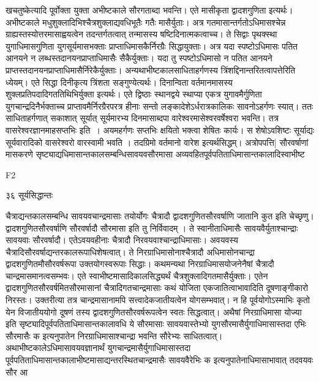 \documentclass[11pt, openany]{book}
\begin{document}
\begin{sloppypar}
\noindent खचतुष्केत्यादि पूर्वोक्ता युक्ता अभीष्टकाले सौरगताब्दा भवन्ति। एते मासीकृता द्वादशगुणिता इत्यर्थः। अभीष्टकाले मधुशुक्लादिभिश्चैत्रशुक्लाद्यवधिभूतैः गतैः मासैर्युताः। अत्र गतमासान्तर्गतोऽधिमासश्चेन्न ग्राह्यस्तस्योत्तरमासाह्वयत्वेन तदन्तर्गतत्वात् तन्मासस्य षष्टिदिनात्मकत्वाच्च। ते सिद्वाः पृथक्स्था युगाधिमासगुणिता युगसूर्यमासभक्ताः प्राप्ताधिमासकैर्निरग्रैः सिद्धायुक्ताः। अत्र यदा स्पष्टोऽधिमासः पतित आनयने न लब्धस्तदानयनप्राप्ताधिमासैः सैकैर्युक्ताः। यदा तु स्पष्टोऽधिमासो न पतित आनयने प्राप्तस्तदानयनप्राप्ताधिमासैर्निरेकैर्युक्ताः। अन्यथाभीष्टकालसाधिताहर्गणस्य त्रिंशद्दिनान्तरितत्वापत्तेरिति ध्येयम्। एते सिद्धा दिनीकृत्य त्रिंशता सङ्गुण्येत्यर्थः। दिनान्विता वर्तमानमासस्य शुक्लप्रतिपदादिगततिथिभिर्युक्ता इत्यर्थः। एते द्विष्ठाः स्थानद्वये स्थाप्या एकत्र युगावमैर्गुणिता युगचान्द्रदिनैर्भक्ताच्च प्राप्तावमैर्निरग्रैरपरत्र हीनाः सन्तो लङ्कादेशेऽर्धरात्रकालिकः सावनोऽहर्गणः स्यात्। ततः साधिताहर्गणात् सकाशात् सूर्यात् सूर्यमारभ्य दिनमासाब्दपा वारेश्वरमासेश्वरवर्षेश्वरा भवन्ति। तत्र वासरेश्वरज्ञानमाह\textendash सप्तभिः इति~। अयमहर्गणः सप्तभिः क्षयितो भक्त्वा शेषितः कार्यः। स शेषोऽवशिष्टः सूर्याद्यः सूर्यवारादिको वासरेश्वरो वारस्वामी भवति । तदग्रिमो वर्तमानो वारेश इत्यर्थसिद्धम्।  अत्रोपपत्ति| सौरवर्षाणां मासकरणे सृष्ट्याद्यधिमासान्तकालसम्बन्धिसावयवसौरमासा अव्यवहितपूर्वपतिताधिमासान्तकालादिस्वाभीष्ट\textendash
\end{sloppypar}
{\tiny{F2}}

\newpage

\noindent ३६ \hspace{4cm} सूर्यसिद्धान्तः
\vspace{1cm}

\begin{sloppypar}
\noindent चैत्राद्यन्तकालसम्बन्धि सावयवचान्द्रमासाः तयोर्योगः चैत्रादौ द्वादशगुणितसौरवर्षाणि जातानि कुत इति चेच्छृणु। द्वादशगुणितसौरवर्षाणि सौरवर्षादौ सौरमासा इति तु निर्विवादम् । ते स्वानीताधिमासैः सावयवैर्युताश्चान्द्राः सावयवाः सौरवर्षादौ। एतेऽवयवहीनाः चैत्रादौ निरवयवाश्चान्द्राधिमासाः। अवयवस्य चैत्रादिसौरवर्षाद्यन्तरकालरूपाधिशेषत्वात्। ते निरग्राधिमासोनाश्चैत्रादौ अधिमासोनचान्द्रा द्वादशगुणितमौसौरवर्षरूपा उक्तयोगस्वरूपाः सिद्धाः। कथमन्यथा निरग्राधिमासयोजनेनैषां चैत्रादौ चान्द्रमासमानत्वसम्भवः। एते स्वाभीष्टमासादिकालसिद्ध्यर्थं चैत्रशुक्लादिगतमासैर्युक्ताः। एतेन द्वादशगुणितसौरवर्षमितसौरमासानां चैत्रादिगतचान्द्रमासाः कथं योजिता एकजातित्वाभावादिति दूषणाङ्गीकारो निरस्तः। उक्तरीत्या तत्र चान्द्रमासानामपि सत्त्वादेकजातीयत्वेन योगसम्भवात्। न हि पूर्वयोगोऽस्माभिः कृतो येन विजातीययोगो दूषणं तस्य द्वादशगुणितसौरवर्षरूपत्वेन स्वतः सिद्धत्वात्। अथैषां निरग्राधिमासा योज्या इति सृष्ट्यादिपूर्वपतिताधिमासान्तकालावधि ये सौरमासाः सावयवास्तेभ्यो युगसौरमासैर्युगाधिमासास्तदा एभिः सौरमासैः क इत्यनुपातेन निरग्राधिमासाश्चान्द्रा भवन्ति सौरेभ्यः साधितत्वात्। अथाभीष्टकालेऽधिमासावयवज्ञानार्थं युगचान्द्रमासैर्युगाधिमासास्तदा पूर्वपतिताधिमासान्तकालाभीष्टमासाद्यन्तरस्थितचान्द्रमासैः सावयवैरेभिः क इत्यनुपातेनाधिमासाभावात् तदवयवः सौर आ\textendash
\end{sloppypar}
\end{document}
